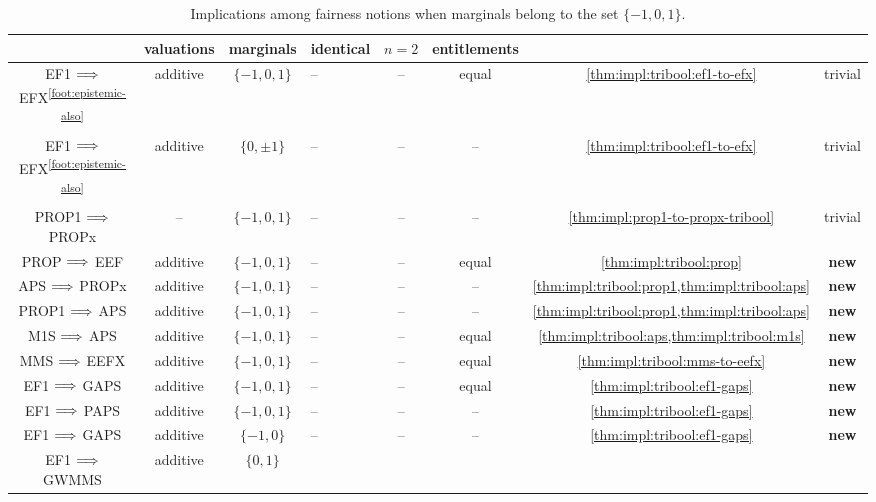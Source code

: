\let\oldFp\defaultFloatPlacement
\renewcommand{\defaultFloatPlacement}{p}
\begin{table}[p]
\centering
\caption[Tribool implications]{Implications among fairness notions when
marginals belong to the set $\{-1, 0, 1\}$.}
\label{table:impls-tribool}
\bigTableSize
\begin{tabular}{cccHcccc}
\toprule & \footnotesize valuations & \footnotesize marginals & \footnotesize identical & \footnotesize $n=2$ & \footnotesize entitlements & &
\\\midrule EF1 $\Longrightarrow$ EFX\textsuperscript{\ref{foot:epistemic-also}}
    & additive & $\{-1, 0, 1\}$ & -- & -- & equal & \cref{thm:impl:tribool:ef1-to-efx} & trivial
\\[\defaultaddspace] EF1 $\Longrightarrow$ EFX\textsuperscript{\ref{foot:epistemic-also}}
    & additive & $\{0, \pm 1\}$ & -- & -- & -- & \cref{thm:impl:tribool:ef1-to-efx} & trivial
\\[\defaultaddspace] PROP1 $\Longrightarrow$ PROPx & -- & $\{-1, 0, 1\}$
    & -- & -- & -- & \cref{thm:impl:prop1-to-propx-tribool} & trivial
%
\\\midrule PROP $\Longrightarrow$ EEF & additive & $\{-1, 0, 1\}$
    & -- & -- & equal & \cref{thm:impl:tribool:prop} & \textbf{new}
\\[\defaultaddspace] APS $\Longrightarrow$ PROPx & additive & $\{-1, 0, 1\}$
    & -- & -- & -- & \cref{thm:impl:tribool:prop1,thm:impl:tribool:aps} & \textbf{new}
\\[\defaultaddspace] PROP1 $\Longrightarrow$ APS & additive & $\{-1, 0, 1\}$
    & -- & -- & -- & \cref{thm:impl:tribool:prop1,thm:impl:tribool:aps} & \textbf{new}
\\[\defaultaddspace] M1S $\Longrightarrow$ APS & additive & $\{-1, 0, 1\}$
    & -- & -- & equal & \cref{thm:impl:tribool:aps,thm:impl:tribool:m1s} & \textbf{new}
\\[\defaultaddspace] MMS $\Longrightarrow$ EEFX & additive & $\{-1, 0, 1\}$
    & -- & -- & equal & \cref{thm:impl:tribool:mms-to-eefx} & \textbf{new}
%
\\\midrule EF1 $\Longrightarrow$ GAPS & additive & $\{-1, 0, 1\}$
    & -- & -- & equal & \cref{thm:impl:tribool:ef1-gaps} & \textbf{new}
\\[\defaultaddspace] EF1 $\Longrightarrow$ PAPS & additive & $\{-1, 0, 1\}$
    & -- & -- & -- & \cref{thm:impl:tribool:ef1-gaps} & \textbf{new}
\\[\defaultaddspace] EF1 $\Longrightarrow$ GAPS & additive & $\{-1, 0\}$
    & -- & -- & -- & \cref{thm:impl:tribool:ef1-gaps} & \textbf{new}
\\[\defaultaddspace] EF1 $\Longrightarrow$ GWMMS & additive & $\{0, 1\}$

\end{tabular}
\end{table}
